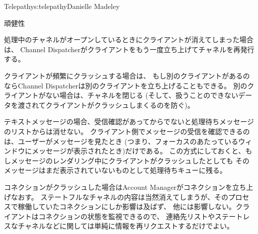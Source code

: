 \begin{aosachapter}{Telepathy}{s:telepathy}{Danielle Madeley}
\begin{aosasect1}{頑健性}
\begin{aosaitemize}
  \item 処理中のチャネルがオープンしているときにクライアントが消えてしまった場合は、
  Channel Dispatcherがクライアントをもう一度立ち上げてチャネルを再発行する。

    クライアントが頻繁にクラッシュする場合は、
    もし別のクライアントがあるのならChannel Dispatcherは別のクライアントを立ち上げることもできる。
    別のクライアントがない場合は、チャネルを閉じる
    (そして、扱うことのできないデータを渡されてクライアントがクラッシュしまくるのを防ぐ)。

    テキストメッセージの場合、受信確認があってからでないと処理待ちメッセージのリストからは消せない。
    クライアント側でメッセージの受信を確認できるのは、ユーザーがメッセージを見たとき
    (つまり、フォーカスのあたっているウィンドウにメッセージが表示されたとき)だけである。
    この方式にしておくと、もしメッセージのレンダリング中にクライアントがクラッシュしたとしても
    そのメッセージはまだ表示されていないものとして処理待ちキューに残る。

  \item コネクションがクラッシュした場合はAccount Managerがコネクションを立ち上げなおす。
  ステートフルなチャネルの内容は当然消えてしまうが、そのプロセスで稼働していたコネクションにしか影響は及ばず、
  他には影響しない。クライアントはコネクションの状態を監視できるので、
  連絡先リストやステートレスなチャネルなどに関しては単純に情報を再リクエストするだけでよい。


\end{aosaitemize}
\end{aosasect1}
\end{aosachapter}
